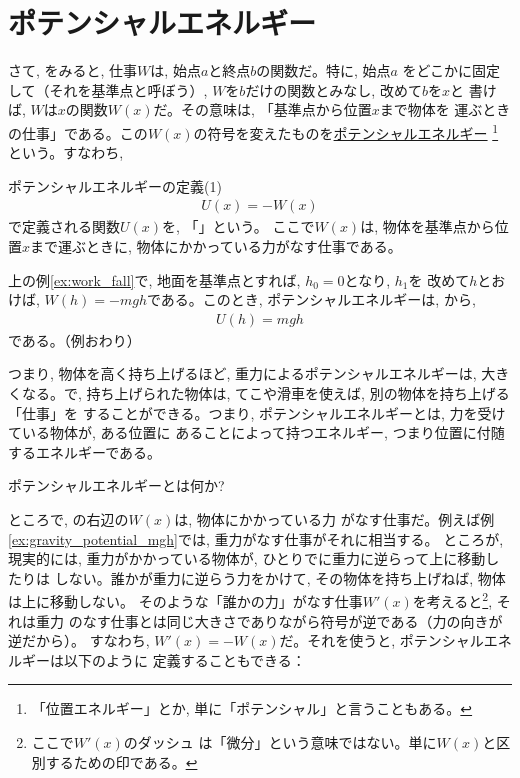 \section{ポテンシャルエネルギー}

さて, をみると, 仕事$W$は, 始点$a$と終点$b$の関数だ。特に, 始点$a$
をどこかに固定して（それを基準点と呼ぼう）, $W$を$b$だけの関数とみなし, 改めて$b$を$x$と
書けば, $W$は$x$の関数$W(x)$だ。その意味は, 「基準点から位置$x$まで物体を
運ぶときの仕事」である。この$W(x)$の符号を変えたものを\underline{ポテンシャルエネルギー}
\footnote{「位置エネルギー」とか, 単に「ポテンシャル」と言うこともある。}という。すなわち, 
\begin{itembox}{ポテンシャルエネルギーの定義(1)}
\begin{eqnarray}
U(x)=-W(x)\label{eq:potential}
\end{eqnarray}
で定義される関数$U(x)$を, 「」という。
ここで$W(x)$は, 物体を基準点から位置$x$まで運ぶときに, 物体にかかっている力がなす仕事である。
\end{itembox}

\begin{exmpl}\label{ex:gravity_potential_mgh}
上の例\ref{ex:work_fall}で, 地面を基準点とすれば, $h_0=0$となり, $h_1$を
改めて$h$とおけば, $W(h)=-mgh$である。このとき, ポテンシャルエネルギーは, 
から, 
\begin{eqnarray}
U(h)=mgh\label{eq:potential_g}
\end{eqnarray}
である。（例おわり）
\end{exmpl}

つまり, 物体を高く持ち上げるほど, 重力によるポテンシャルエネルギーは, 
大きくなる。で, 持ち上げられた物体は, てこや滑車を使えば, 別の物体を持ち上げる「仕事」を
することができる。つまり, ポテンシャルエネルギーとは, 力を受けている物体が, ある位置に
あることによって持つエネルギー, つまり位置に付随するエネルギーである。


%
\begin{q}\label{q:def_potential}
ポテンシャルエネルギーとは何か? 
\end{q}

ところで, の右辺の$W(x)$は, 物体にかかっている力
がなす仕事だ。例えば例\ref{ex:gravity_potential_mgh}では, 重力がなす仕事がそれに相当する。
ところが, 現実的には, 重力がかかっている物体が, ひとりでに重力に逆らって上に移動したりは
しない。誰かが重力に逆らう力をかけて, その物体を持ち上げねば, 物体は上に移動しない。
そのような「誰かの力」がなす仕事$W'(x)$を考えると\footnote{ここで$W'(x)$のダッシュ
は「微分」という意味ではない。単に$W(x)$と区別するための印である。}, それは重力
のなす仕事とは同じ大きさでありながら符号が逆である（力の向きが逆だから）。
すなわち, $W'(x)=-W(x)$だ。それを使うと, ポテンシャルエネルギーは以下のように
定義することもできる：

